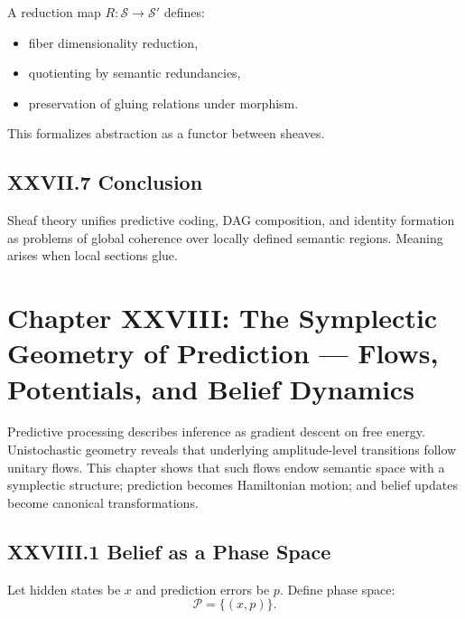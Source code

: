 \documentclass[11pt,letterpaper]{article}
\begin{document}
A reduction map $R : \mathcal{S}\to\mathcal{S}'$ defines:

\begin{itemize}
    \item fiber dimensionality reduction,
    \item quotienting by semantic redundancies,
    \item preservation of gluing relations under morphism.
\end{itemize}

This formalizes abstraction as a functor between sheaves.

\subsection{XXVII.7 Conclusion}

Sheaf theory unifies predictive coding, DAG composition, and identity formation as problems of global coherence over locally defined semantic regions. Meaning arises when local sections glue.

\newpage

\section{Chapter XXVIII: The Symplectic Geometry of Prediction —  
Flows, Potentials, and Belief Dynamics}

Predictive processing describes inference as gradient descent on free energy. Unistochastic geometry reveals that underlying amplitude-level transitions follow unitary flows. This chapter shows that such flows endow semantic space with a symplectic structure; prediction becomes Hamiltonian motion; and belief updates become canonical transformations.

\subsection{XXVIII.1 Belief as a Phase Space}

Let hidden states be $x$ and prediction errors be $p$.  
Define phase space:
\[
\mathcal{P} = \{(x,p)\}.
\]
\end{document}
